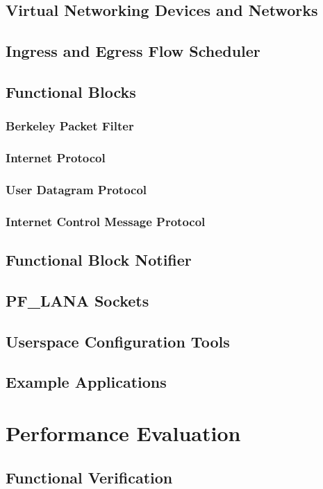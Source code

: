 \section{Virtual Networking Devices and Networks}
\section{Ingress and Egress Flow Scheduler}
\section{Functional Blocks} %
\subsection{Berkeley Packet Filter}
\subsection{Internet Protocol}
\subsection{User Datagram Protocol}
\subsection{Internet Control Message Protocol}
\section{Functional Block Notifier}
\section{PF\_LANA Sockets}
\section{Userspace Configuration Tools}
\section{Example Applications}

\chapter{\label{chp:content} Performance Evaluation}
\section{Functional Verification}
